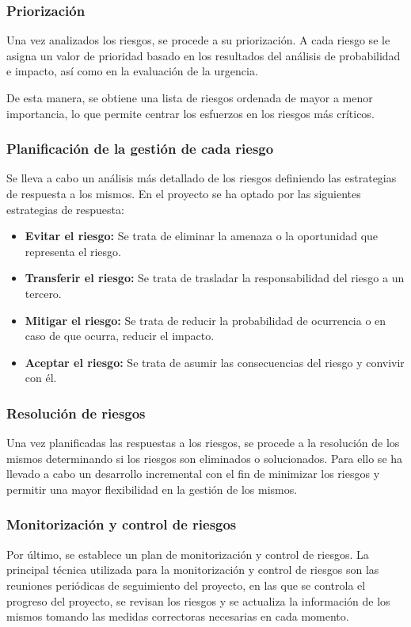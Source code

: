 \subsubsection*{Priorización}
Una vez analizados los riesgos, se procede a su priorización. A cada riesgo se le asigna un valor de prioridad basado en los resultados del análisis de probabilidad e impacto, así como en la evaluación de la urgencia.

De esta manera, se obtiene una lista de riesgos ordenada de mayor a menor importancia, lo que permite centrar los esfuerzos en los riesgos más críticos.

\subsubsection*{Planificación de la gestión de cada riesgo}
Se lleva a cabo un análisis más detallado de los riesgos definiendo las estrategias de respuesta a los mismos. 
En el proyecto se ha optado por las siguientes estrategias de respuesta:
\begin{itemize}
    \item \textbf{Evitar el riesgo:} Se trata de eliminar la amenaza o la oportunidad que representa el riesgo.
    \item \textbf{Transferir el riesgo:} Se trata de trasladar la responsabilidad del riesgo a un tercero.
    \item \textbf{Mitigar el riesgo:} Se trata de reducir la probabilidad de ocurrencia o en caso de que ocurra, reducir el impacto.
    \item \textbf{Aceptar el riesgo:} Se trata de asumir las consecuencias del riesgo y convivir con él.
\end{itemize}

\subsubsection*{Resolución de riesgos}
Una vez planificadas las respuestas a los riesgos, se procede a la resolución de los mismos determinando si los riesgos son eliminados o solucionados. 
Para ello se ha llevado a cabo un desarrollo incremental con el fin de minimizar los riesgos y permitir una mayor flexibilidad en la gestión de los mismos.

\subsubsection*{Monitorización y control de riesgos}
Por último, se establece un plan de monitorización y control de riesgos. 
La principal técnica utilizada para la monitorización y control de riesgos son las reuniones periódicas de seguimiento del proyecto, en las que se controla el progreso del proyecto, se revisan los riesgos y se actualiza la información de los mismos tomando las medidas correctoras necesarias en cada momento.